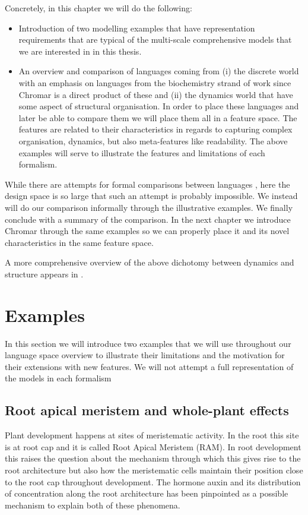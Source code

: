 Concretely, in this chapter we will do the following:
\begin{itemize}

\item Introduction of two modelling examples that have representation
  requirements that are typical of the multi-scale comprehensive models that we
  are interested in in this thesis.
\item An overview and comparison of languages coming from (i) the discrete world
  with an emphasis on languages from the biochemistry strand of work since
  Chromar is a direct product of these and (ii) the dynamics world that have
  some aspect of structural organisation. In order to place these languages and
  later be able to compare them we will place them all in a feature space. The
  features are related to their characteristics in regards to capturing complex
  organisation, dynamics, but also meta-features like readability. The above
  examples will serve to illustrate the features and limitations of each
  formalism.
\end{itemize}
While there are attempts for formal comparisons between languages
\citep{felleisen1991expressive}, here the design space is so large that such an
attempt is probably impossible. We instead will do our comparison informally
through the illustrative examples. We finally conclude with a summary of the
comparison. In the next chapter we introduce Chromar through the same examples
so we can properly place it and its novel characteristics in the same feature
space.

A more comprehensive overview of the above dichotomy between dynamics and
structure appears in \citet{fontana1996barrier}.

\section{Examples}
\label{sec:examples}
In this section we will introduce two examples that we will use throughout our
language space overview to illustrate their limitations and the motivation
for their extensions with new features. We will not attempt a full
representation of the models in each formalism

\subsection{Root apical meristem and whole-plant effects}
\label{subsec:rootDev}
Plant development happens at sites of meristematic activity. In the root this
site is at root cap and it is called Root Apical Meristem (RAM). In root
development this raises the question about the mechanism through which this gives
rise to the root architecture but also how the meristematic cells maintain their
position close to the root cap throughout development. The hormone auxin and its
distribution of concentration along the root architecture has been pinpointed as
a possible mechanism to explain both of these phenomena.

